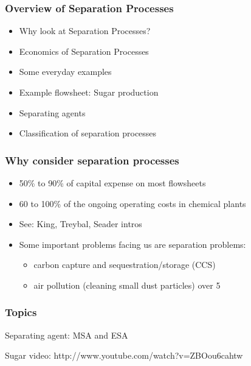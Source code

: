 
\begin{frame}\frametitle{Overview of Separation Processes}
	
	\begin{itemize}
		\item	Why look at Separation Processes?
		\item	Economics of Separation Processes
		\item	Some everyday examples
		\item	Example flowsheet: Sugar production
		\item	Separating agents
		\item	Classification of separation processes		
	\end{itemize}
\end{frame}

\begin{frame}\frametitle{Why consider separation processes}
	\begin{itemize}
		\item	50\% to 90\% of capital expense on most flowsheets
		\item	60 to 100\% of the ongoing operating costs in chemical plants
		\item	See: King, Treybal, Seader intros
		\item	Some important problems facing us are separation problems:
		\begin{itemize}
			\item	carbon capture and sequestration/storage (CCS)
			\item	air pollution (cleaning small dust particles) over 5\micron
			
		\end{itemize}
		
	\end{itemize}
\end{frame}

\begin{frame}\frametitle{Topics}
	Separating agent: MSA and ESA
\end{frame}

Sugar video: http://www.youtube.com/watch?v=ZBOou6cahtw

